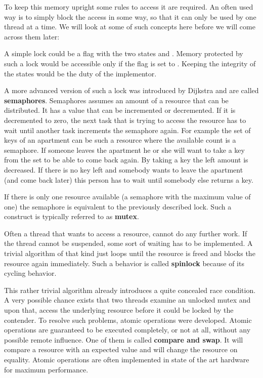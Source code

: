 To keep this memory upright some rules to access it are required. An often used way is to simply block the access in some way, so that it can only be used by one thread at a time. We will look at some of such concepts here before we will come across them later:
 
A simple lock could be a flag with the two states  and . Memory protected by such a lock would be accessible only if the flag is set to . Keeping the integrity of the states would be the duty of the implementor.

A more advanced version of such a lock was introduced by Dijkstra\cite{dijkstra1968cooperating} and are called \textbf{semaphores}. Semaphores assumes an amount of a resource that can be distributed. It has a value that can be incremented or decremented. If it is decremented to zero, the next task that is trying to access the resource has to wait until another task increments the semaphore again. For example the set of keys of an apartment can be such a resource where the available count is a semaphore. If someone leaves the apartment he or she will want to take a key from the set to be able to come back again. By taking a key the left amount is decreased. If there is no key left and somebody wants to leave the apartment (and come back later) this person has to wait until somebody else returns a key.

If there is only one resource available (a semaphore with the maximum value of one) the semaphore is equivalent to the previously described lock. Such a construct is typically referred to as \textbf{mutex}.

Often a thread that wants to access a resource, cannot do any further work. If the thread cannot be suspended, some sort of waiting has to be implemented. A trivial algorithm of that kind just loops until the resource is freed and blocks the resource again immediately. Such a behavior is called \textbf{spinlock} because of its cycling behavior.

This rather trivial algorithm already introduces a quite concealed race condition. A very possible chance exists that two threads examine an unlocked mutex and upon that, access the underlying resource before it could be locked by the contender. To resolve such problems, atomic operations were developed. Atomic operations are guaranteed to be executed completely, or not at all, without any possible remote influence. One of them is called \textbf{compare and swap}. It will compare a resource with an expected value and will change the resource on equality. Atomic operations are often implemented in state of the art hardware for maximum performance.

